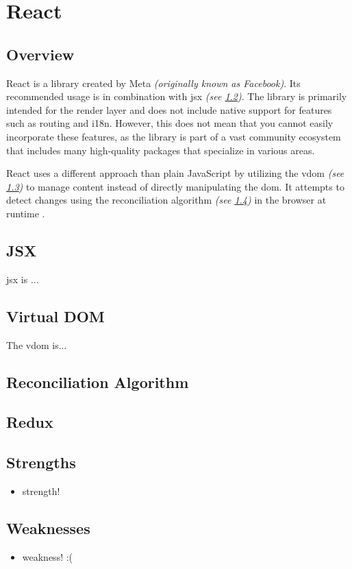 \section{React}
\label{sec:react}

\subsection{Overview}
\label{subsec:react:overview}

React is a \gls{library} created by Meta \textit{(originally known as Facebook)}. Its recommended usage is in combination with \acrshort{jsx} \textit{(see \ref{subsec:jsx})}. 
The library is primarily intended for the render layer and does not include native support for features such as routing and \acrshort{i18n}. However, this does not mean that you cannot easily incorporate these features, as the library is part of a vast community ecosystem that includes many high-quality packages that specialize in various areas.

React uses a different approach than plain JavaScript by utilizing the \acrshort{vdom} \cite{react:vdom} \textit{(see \ref{subsec:vdom})} to manage content instead of directly manipulating the \acrshort{dom}. It attempts to detect changes using the reconciliation algorithm \textit{(see \ref{subsec:react:reconciliation_algorithm})} in the browser at runtime \cite{react:reconciliation}.

\subsection{JSX}
\label{subsec:jsx}

\acrfull{jsx} is ...

\subsection{Virtual DOM}
\label{subsec:vdom}

The \acrshort{vdom} is...



\subsection{Reconciliation Algorithm}
\label{subsec:react:reconciliation_algorithm}

\subsection{Redux}
\label{subsec:redux}

\subsection{Strengths}
\label{subsec:react:strengths}
\begin{itemize}
    \item strength! 
\end{itemize}

\subsection{Weaknesses}
\label{subsec:react:weaknesses}
\begin{itemize}
    \item weakness! :( 
\end{itemize}